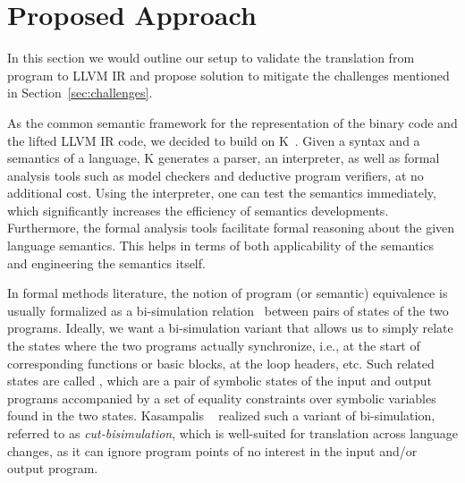 \section{Proposed Approach}\label{sec:approach} In this section we would
outline our setup to validate the translation from \ISA program to LLVM IR and
propose solution to mitigate the challenges mentioned in
Section~\ref{sec:challenges}.


As the common semantic framework for the representation of the binary code and
the lifted LLVM IR code, we decided to build on K~\cite{k-primer-2013-v32}.
        Given a syntax and a semantics of a language, K generates a parser, an
        interpreter, as well as formal analysis tools such as model checkers
        and deductive program verifiers, at no additional cost.  Using the
        interpreter, one can test the semantics immediately, which
        significantly increases the efficiency of semantics developments.
        Furthermore, the formal analysis tools facilitate formal reasoning
        about the given language semantics. This helps in terms of both
        applicability of the semantics and engineering the semantics itself.
    

In formal methods literature, the notion of program (or semantic) equivalence
is usually formalized as a bi-simulation relation~\cite{Sangiorgi:2011} between
pairs of states of the two programs.
Ideally, we want a bi-simulation variant that allows us to simply relate the
states where the two programs actually synchronize, i.e., at the start of
corresponding functions or basic blocks, at the loop headers, etc. Such related states are called \syncps, which are a pair of symbolic states of the input and output programs accompanied by a set of equality constraints over symbolic variables found in the two states. Kasampalis \etal~\cite{TheoSAS19} realized such a variant of bi-simulation, referred to as  \emph{cut-bisimulation}, which is  well-suited for translation  across
language changes, as it can ignore program points of no interest in the input
and/or output program.
%

